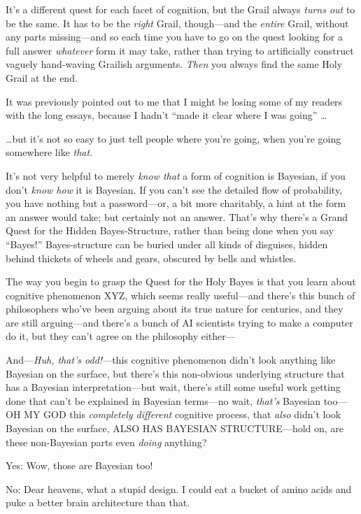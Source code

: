 {
 It's a different quest for each facet of
cognition, but the Grail always \textit{turns out} to be the same. It
has to be the \textit{right} Grail, though---and the \textit{entire}
Grail, without any parts missing---and so each time you have to go on
the quest looking for a full answer \textit{whatever} form it may take,
rather than trying to artificially construct vaguely hand-waving
Grailish arguments. \textit{Then} you always find the same Holy Grail
at the end.}

{
 It was previously pointed out to me that I might be losing some of
my readers with the long essays, because I hadn't
``made it clear where I was going''
\ldots}

{
 \ldots but it's not so easy to just tell people
where you're going, when you're going
somewhere like \textit{that}.}

{
 It's not very helpful to merely \textit{know that}
a form of cognition is Bayesian, if you don't
\textit{know how} it is Bayesian. If you can't see the
detailed flow of probability, you have nothing but a password---or, a
bit more charitably, a hint at the form an answer would take; but
certainly not an answer. That's why
there's a Grand Quest for the Hidden Bayes-Structure,
rather than being done when you say
``Bayes!'' Bayes-structure can be
buried under all kinds of disguises, hidden behind thickets of wheels
and gears, obscured by bells and whistles.}

{
 The way you begin to grasp the Quest for the Holy Bayes is that
you learn about cognitive phenomenon XYZ, which seems really
useful---and there's this bunch of philosophers
who've been arguing about its true nature for
centuries, and they are still arguing---and there's a
bunch of AI scientists trying to make a computer do it, but they
can't agree on the philosophy either---}

{
 And---\textit{Huh, that's odd!}{}---this cognitive
phenomenon didn't look anything like Bayesian on the
surface, but there's this non-obvious underlying
structure that has a Bayesian interpretation---but wait,
there's still some useful work getting done that
can't be explained in Bayesian terms---no wait,
\textit{that's} Bayesian too---OH MY GOD this
\textit{completely different} cognitive process, that \textit{also}
didn't look Bayesian on the surface, ALSO HAS BAYESIAN
STRUCTURE---hold on, are these non-Bayesian parts even \textit{doing}
anything?}

{
 Yes: Wow, those are Bayesian too!}

{
 No: Dear heavens, what a stupid design. I could eat a bucket of
amino acids and puke a better brain architecture than that.}

